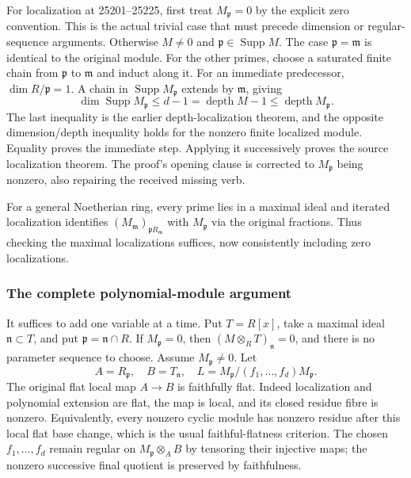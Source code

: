For localization at 25201--25225, first treat \(M_{\mathfrak p}=0\) by the explicit zero convention. This is the actual trivial case that must precede dimension or regular-sequence arguments. Otherwise \(M\ne0\) and \(\mathfrak p\in\operatorname{Supp}M\). The case \(\mathfrak p=\mathfrak m\) is identical to the original module. For the other primes, choose a saturated finite chain from \(\mathfrak p\) to \(\mathfrak m\) and induct along it. For an immediate predecessor, \(\dim R/\mathfrak p=1\). A chain in \(\operatorname{Supp}M_{\mathfrak p}\) extends by \(\mathfrak m\), giving \[
 \dim\operatorname{Supp}M_{\mathfrak p}\le d-1
 =\operatorname{depth}M-1
 \le\operatorname{depth}M_{\mathfrak p}.
\] The last inequality is the earlier depth-localization theorem, and the opposite dimension/depth inequality holds for the nonzero finite localized module. Equality proves the immediate step. Applying it successively proves the source localization theorem. The proof's opening clause is corrected to \(M_{\mathfrak p}\) being nonzero, also repairing the received missing verb.

For a general Noetherian ring, every prime lies in a maximal ideal and iterated localization identifies \((M_{\mathfrak m})_{\mathfrak pR_{\mathfrak m}}\) with \(M_{\mathfrak p}\) via the original fractions. Thus checking the maximal localizations suffices, now consistently including zero localizations.

\subsubsection{The complete polynomial-module argument}\label{algebra-proof-019-the-complete-polynomial-module-argument}

It suffices to add one variable at a time. Put \(T=R[x]\), take a maximal ideal \(\mathfrak n\subset T\), and put \(\mathfrak p=\mathfrak n\cap R\). If \(M_{\mathfrak p}=0\), then \((M\otimes_R T)_{\mathfrak n}=0\), and there is no parameter sequence to choose. Assume \(M_{\mathfrak p}\ne0\). Let \[
 A=R_{\mathfrak p},\quad B=T_{\mathfrak n},\quad
 L=M_{\mathfrak p}/(f_1,\ldots,f_d)M_{\mathfrak p}.
\] The original flat local map \(A\to B\) is faithfully flat. Indeed localization and polynomial extension are flat, the map is local, and its closed residue fibre is nonzero. Equivalently, every nonzero cyclic module has nonzero residue after this local flat base change, which is the usual faithful-flatness criterion. The chosen \(f_1,\ldots,f_d\) remain regular on \(M_{\mathfrak p}\otimes_A B\) by tensoring their injective maps; the nonzero successive final quotient is preserved by faithfulness.

